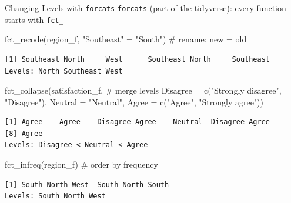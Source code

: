 \documentclass[
  ignorenonframetext,
  aspectratio=169,
]{beamer}
\newenvironment{Shaded}{\begin{snugshade}}{\end{snugshade}}
\newcommand{\AttributeTok}[1]{\textcolor[rgb]{0.40,0.45,0.13}{#1}}
\newcommand{\CommentTok}[1]{\textcolor[rgb]{0.37,0.37,0.37}{#1}}
\newcommand{\FunctionTok}[1]{\textcolor[rgb]{0.28,0.35,0.67}{#1}}
\newcommand{\NormalTok}[1]{\textcolor[rgb]{0.00,0.23,0.31}{#1}}
\newcommand{\OtherTok}[1]{\textcolor[rgb]{0.00,0.23,0.31}{#1}}
\newcommand{\StringTok}[1]{\textcolor[rgb]{0.13,0.47,0.30}{#1}}
\begin{document}
\begin{frame}[fragile]{Changing Levels with \texttt{forcats}}
\protect\hypertarget{changing-levels-with-forcats}{}
\texttt{forcats} (part of the tidyverse): every function starts with
\texttt{fct\_}

\begin{Shaded}
\begin{Highlighting}[]
\FunctionTok{fct\_recode}\NormalTok{(region\_f, }\StringTok{"Southeast"} \OtherTok{=} \StringTok{"South"}\NormalTok{)     }\CommentTok{\# rename: new = old}
\end{Highlighting}
\end{Shaded}

\begingroup\tiny\color{darkgray}

\begin{verbatim}
[1] Southeast North     West      Southeast North     Southeast
Levels: North Southeast West
\end{verbatim}

\endgroup

\begin{Shaded}
\begin{Highlighting}[]
\FunctionTok{fct\_collapse}\NormalTok{(satisfaction\_f,                    }\CommentTok{\# merge levels}
             \AttributeTok{Disagree =} \FunctionTok{c}\NormalTok{(}\StringTok{"Strongly disagree"}\NormalTok{, }\StringTok{"Disagree"}\NormalTok{),}
             \AttributeTok{Neutral  =} \StringTok{"Neutral"}\NormalTok{,}
             \AttributeTok{Agree    =} \FunctionTok{c}\NormalTok{(}\StringTok{"Agree"}\NormalTok{, }\StringTok{"Strongly agree"}\NormalTok{))}
\end{Highlighting}
\end{Shaded}

\begingroup\tiny\color{darkgray}

\begin{verbatim}
[1] Agree    Agree    Disagree Agree    Neutral  Disagree Agree   
[8] Agree   
Levels: Disagree < Neutral < Agree
\end{verbatim}

\endgroup

\begin{Shaded}
\begin{Highlighting}[]
\FunctionTok{fct\_infreq}\NormalTok{(region\_f)                            }\CommentTok{\# order by frequency}
\end{Highlighting}
\end{Shaded}

\begingroup\tiny\color{darkgray}

\begin{verbatim}
[1] South North West  South North South
Levels: South North West
\end{verbatim}

\endgroup
\end{frame}
\end{document}

